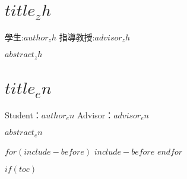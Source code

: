 \documentclass[$if(fontsize)$$fontsize$,$endif$$if(lang)$$lang$,$endif$$if(papersize)$$papersize$,$endif$$for(classoption)$$classoption$$sep$,$endfor$]{$documentclass$}
\newcommand{\loflabel}{圖}
\newcommand\frontmatter{
    \cleardoublepage
    \pagenumbering{roman}
}
\begin{document}
    \frontmatter

    \chapter*{$title_zh$}
    \begin{center}
        \vspace{0.4cm}
        \fontsize{14}{21}\selectfont
        學生:$author_zh$ \hfill 指導教授:$advisor_zh$\par
        \vspace{1cm}
        \fontsize{14}{21}\selectfont{
            $university_zh$ $institute_zh$\par
        }
        \vspace{0.9cm}
        \fontsize{20}{30}
    \end{center}
    $abstract_zh$


    \chapter*{$title_en$}
    \begin{center}
        \vspace{0.4cm}
        \fontsize{14}{21}\selectfont
        Student：$author_en$ \hfill Advisor：$advisor_en$\\
        \vspace{1cm}
        \fontsize{14}{21}\selectfont{
            $institute_en$\\$university_en$\par
        }
        \vspace{0.9cm}
        \fontsize{20}{30}
    \end{center}
    $abstract_en$

    $for(include-before)$
        $include-before$
    $endfor$

    $if(toc)$
        \begingroup
            \singlespacing
            \tableofcontents

            \renewcommand{\numberline}[1]{\loflabel~#1\hspace*{1em}}
            \listoffigures
\end{document}
